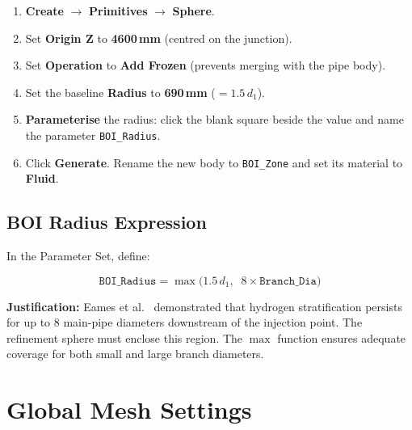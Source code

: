 \documentclass[12pt,a4paper]{report}
\begin{document}
\begin{enumerate}
  \item \textbf{Create} $\rightarrow$ \textbf{Primitives} $\rightarrow$
        \textbf{Sphere}.
  \item Set \textbf{Origin Z} to \textbf{4600\,mm} (centred on the junction).
  \item Set \textbf{Operation} to \textbf{Add Frozen} (prevents merging with
        the pipe body).
  \item Set the baseline \textbf{Radius} to \textbf{690\,mm} ($= 1.5\,d_1$).
  \item \textbf{Parameterise} the radius: click the blank square beside the
        value and name the parameter \texttt{BOI\_Radius}.
  \item Click \textbf{Generate}.  Rename the new body to \texttt{BOI\_Zone}
        and set its material to \textbf{Fluid}.
\end{enumerate}

\subsection{BOI Radius Expression}

In the Parameter Set, define:

\begin{equation}
  \texttt{BOI\_Radius}
  = \max\!\bigl(1.5\,d_1,\;\; 8 \times \texttt{Branch\_Dia}\bigr)
  \label{eq:boiradius}
\end{equation}

\noindent\textbf{Justification:} Eames et al.~\cite{Eames2022} demonstrated
that hydrogen stratification persists for up to 8 main-pipe diameters
downstream of the injection point.  The refinement sphere must enclose this
region.  The $\max$ function ensures adequate coverage for both small and large
branch diameters.

\medskip
\noindent{}


\section{Global Mesh Settings}
\end{document}
